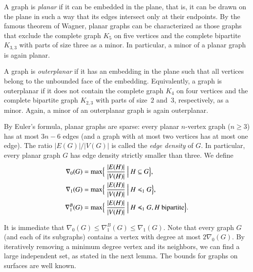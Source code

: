 A graph is \emph{planar} if it can be embedded in the plane, that is,
it can be drawn on the plane in such a way that its edges intersect
only at their endpoints. By the famous theorem of Wagner, planar
graphs can be characterized as those graphs that exclude the complete
graph $K_5$ on five vertices and the complete bipartite $K_{3,3}$ with
parts of size three as a minor. In particular, a minor of a planar graph
is again planar. 

A graph is \emph{outerplanar} if it has an embedding in the plane such
that all vertices belong to the unbounded face of the embedding.
Equivalently, a graph is outerplanar if it does not contain the
complete graph $K_4$ on four vertices and the complete bipartite graph
$K_{2,3}$ with parts of size~$2$ and~$3$, respectively, as a minor. 
Again, a minor of an outerplanar graph is again outerplanar. 

By Euler's formula, planar graphs are sparse: every planar $n$-vertex
graph ($n\geq 3$) has at most $3n-6$ edges (and a graph with at most
two vertices has at most one edge).
The ratio $|E(G)|/|V(G)|$ is
called the \emph{edge density} of $G$.
In particular, every planar
graph $G$ has edge density strictly smaller than three.
We define
\begin{align*}
\nabla_0(G)&=\max\Bigl\{\ \frac{|E(H)|}{|V(H)|}\ \Bigr|\  H\subseteq G\Bigr\},\\
\nabla_1(G)&=\max\Bigl\{\ \frac{|E(H)|}{|V(H)|}\ \Bigr| \  H\preccurlyeq_1 G\Bigr\},\\
\nabla_1^B(G)&=\max\Bigl\{\ \frac{|E(H)|}{|V(H)|}\ \Bigr| \  H\preccurlyeq_1 G, H\text{ bipartite}\Bigr\}.
\end{align*}


  It is immediate 
that $\nabla_0(G) \le \nabla_1^B(G)\le\nabla_1(G)$. Note that every graph $G$ (and each of its subgraphs)
contains a vertex with degree at most $2\nabla_0(G)$. By iteratively
removing a minimum degree vertex and its neighbors, we can  find a 
large independent set, as stated in the next lemma. The bounds for graphs
on surfaces are well known.

